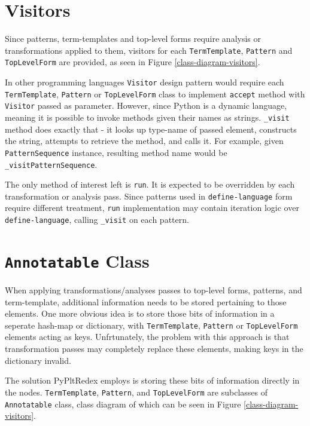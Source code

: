 \section{Visitors}
Since patterns, term-templates and top-level forms require analysis or transformations applied to them, visitors for each \texttt{TermTemplate}, \texttt{Pattern} and \texttt{TopLevelForm} are provided, as seen in Figure \ref{class-diagram-visitors}. 

In other programming languages \texttt{Visitor} design pattern would require each \texttt{TermTemplate}, \texttt{Pattern} or \texttt{TopLevelForm} class to implement \texttt{accept} method with \texttt{Visitor} passed as parameter. However, since Python is a dynamic language, meaning it is possible to invoke methods given their names as strings. \texttt{\_visit} method does exactly that - it looks up type-name of passed element, constructs the string, attempts to retrieve the method, and calls it. For example, given \texttt{PatternSequence} instance, resulting method name would be \texttt{\_visitPatternSequence}.

The only method of interest left is \texttt{run}. It is expected to be overridden by each transformation or analysis pass.  Since patterns used in \texttt{define-language} form require different treatment, \texttt{run} implementation may contain iteration logic over \texttt{define-language}, calling \texttt{\_visit} on each pattern. 

\section{\texttt{Annotatable} Class}

When applying transformations/analyses passes to top-level forms, patterns, and term-template, additional information needs to be stored pertaining to those elements. One more obvious idea is to store those bits of information in a seperate hash-map or dictionary, with \texttt{TermTemplate}, \texttt{Pattern} or \texttt{TopLevelForm} elements acting as keys. Unfrtunately, the problem with this approach is that transformation passes may completely replace these elements, making keys in the dictionary invalid.

The solution PyPltRedex employs is storing these bits of information directly in the nodes. \texttt{TermTemplate}, \texttt{Pattern}, and \texttt{TopLevelForm} are subclasses of \texttt{Annotatable} class, class diagram of which can be seen in Figure \ref{class-diagram-visitors}.

